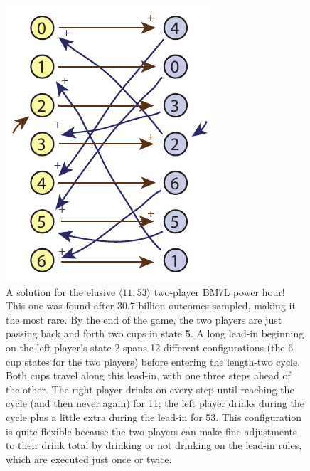 \documentclass[twocolumn]{article}
\begin{document}
\begin{figure}[ht!]
\begin{center}
\includegraphics[width=0.90 \linewidth]{dual11-53.pdf}
\end{center}\vspace{-0.1in}
\caption{ A solution for the elusive $\langle 11, 53 \rangle$ two-player
  BM7L power hour! This one was found after 30.7 billion outcomes sampled,
  making it the most rare. By the end of the game, the two players are
  just passing back and forth two cups in state 5. A long lead-in beginning
  on the left-player's state 2 spans 12 different configurations (the 6
  cup states for the two players) before entering the length-two cycle.
  Both cups travel along this lead-in, with one three steps ahead of the
  other. The right player drinks on every step until reaching the cycle
  (and then never again) for 11; the left player drinks during the cycle
  plus a little extra during the lead-in for 53. This configuration is
  quite flexible because the two players can make fine adjustments to
  their drink total by drinking or not drinking on the lead-in rules,
  which are executed just once or twice.}
\label{fig:dual11-53}
\end{figure}
\end{document}
